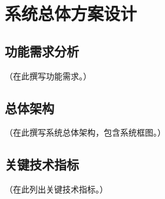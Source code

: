 \chapter{系统总体方案设计}

\section{功能需求分析}
（在此撰写功能需求。）

\section{总体架构}
（在此撰写系统总体架构，包含系统框图。）

\section{关键技术指标}
（在此列出关键技术指标。）
